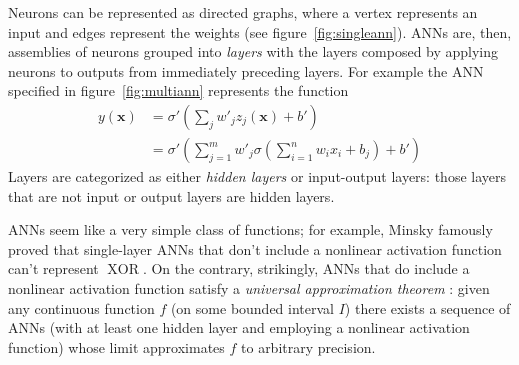 Neurons can be represented as directed graphs, where a vertex represents an input and edges represent the weights (see figure~\ref{fig:singleann}).
%
ANNs are, then, assemblies of neurons grouped into \textit{layers} with the layers composed by applying neurons to outputs from immediately preceding layers.
%
For example the ANN specified in figure~\ref{fig:multiann} represents the function
\begin{equation}
    \begin{split}
        y(\mathbf{x}) &= \sigma' \left( \sum_j w'_j z_j(\mathbf{x}) + b' \right) \\
        &=  \sigma' \left( \sum_{j=1}^m w'_j \sigma\left(\sum_{i=1}^n w_i x_i + b_j\right) + b' \right)
    \end{split}
\end{equation}
%
Layers are categorized as either \textit{hidden layers} or input-output layers: those layers that are not input or output layers are hidden layers.

ANNs seem like a very simple class of functions; for example, Minsky \etal \cite{minsky2017perceptrons} famously proved that single-layer ANNs that don't include a nonlinear activation function can't represent \(\operatorname{XOR}\). 
%
On the contrary, strikingly, ANNs that do include a nonlinear activation function satisfy a \textit{universal approximation theorem} \cite{cybenko1989approximation}:
%
given any continuous function \(f\) (on some bounded interval \(I\)) there exists a sequence of ANNs (with at least one hidden layer and employing a nonlinear activation function) whose limit approximates \(f\) to arbitrary precision.

